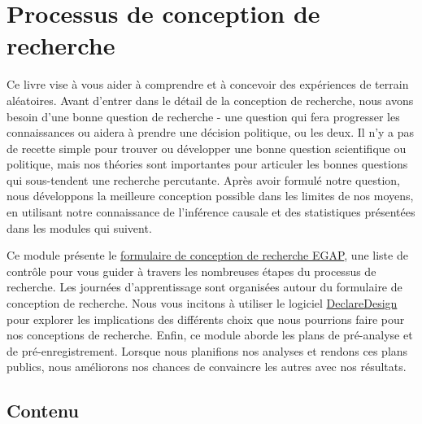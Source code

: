 \documentclass[
  12pt,
]{book}
\begin{document}
\hypertarget{processus-de-conception-de-recherche}{%
\chapter{Processus de conception de recherche}\label{processus-de-conception-de-recherche}}

Ce livre vise à vous aider à comprendre et à concevoir des expériences de terrain aléatoires. Avant d'entrer dans le détail de la conception de recherche, nous avons besoin d'une bonne question de recherche - une question qui fera progresser les connaissances ou aidera à prendre une décision politique, ou les deux. Il n'y a pas de recette simple pour trouver ou développer une bonne question scientifique ou politique, mais nos théories sont importantes pour articuler les bonnes questions qui sous-tendent une recherche percutante. Après avoir formulé notre question, nous développons la meilleure conception possible dans les limites de nos moyens, en utilisant notre connaissance de l'inférence causale et des statistiques présentées dans les modules qui suivent.

Ce module présente le \href{https://egap.github.io/learningdays-resources/Exercises/design-form.Rmd}{formulaire de conception de recherche EGAP}, une liste de contrôle pour vous guider à travers les nombreuses étapes du processus de recherche. Les journées d'apprentissage sont organisées autour du formulaire de conception de recherche. Nous vous incitons à utiliser le logiciel \href{https://declaredesign.org}{DeclareDesign} pour explorer les implications des différents choix que nous pourrions faire pour nos conceptions de recherche. Enfin, ce module aborde les plans de pré-analyse et de pré-enregistrement. Lorsque nous planifions nos analyses et rendons ces plans publics, nous améliorons nos chances de convaincre les autres avec nos résultats.

\hypertarget{contenu}{%
\section{Contenu}\label{contenu}}
\end{document}
